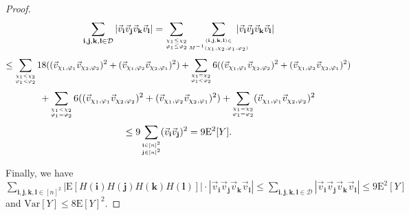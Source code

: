 \def\draft{0}  \documentclass[proceedings]{stacs}
\theoremstyle{plain}\newtheorem{satz}[thm]{Satz}
\theoremstyle{definition}\newtheorem{crucial}[thm]{Crucial Definition}
\begin{document}
\begin{proof}
$$
\sum_{\mathbf i, \mathbf j, \mathbf k, \mathbf l \in \mathcal D} |\vec v_{\mathbf i}\vec v_{\mathbf j}\vec v_{\mathbf k}\vec v_{\mathbf l}|
 =  \sum_{\scriptsize{}\substack{\chi_1 \leq \chi_2 \\ \varphi_1 \leq \varphi_2}}\sum_{\scriptsize{}\substack{(\mathbf i, \mathbf j, \mathbf k, \mathbf l) \in \\  M^{-1}(\chi_1,\chi_2,\varphi_1, \varphi_2)}}\hspace{-.5cm} |\vec v_{\mathbf i}\vec v_{\mathbf j}\vec v_{\mathbf k}\vec v_{\mathbf l}| \\
$$
$$
\leq \sum_{\scriptsize{}\substack{\chi_1 < \chi_2 \\ \varphi_1 < \varphi_2}} 18((\vec v_{\chi_1, \varphi_1}\vec v_{\chi_2, \varphi_2})^2 + (
\vec v_{\chi_1, \varphi_2}\vec v_{\chi_2, \varphi_1})^2) + \sum_{\scriptsize{}\substack{\chi_1 = \chi_2 \\ \varphi_1 < \varphi_2}} 6((\vec v_{\chi_1, \varphi_1}\vec v_{\chi_2, \varphi_2})^2 + (
\vec v_{\chi_1, \varphi_2}\vec v_{\chi_2, \varphi_1})^2) 
$$
$$
+ \sum_{\scriptsize{}\substack{\chi_1 < \chi_2 \\ \varphi_1 = \varphi_2}} 6((\vec v_{\chi_1, \varphi_1}\vec v_{\chi_2, \varphi_2})^2 + (
\vec v_{\chi_1, \varphi_2} \vec v_{\chi_2, \varphi_1})^2) + \sum_{\scriptsize{}\substack{\chi_1 = \chi_2 \\ \varphi_1 = \varphi_2}} (\vec v_{\chi_1, \varphi_1}\vec v_{\chi_2, \varphi_2})^2 \\
$$
$$
\leq 9 \sum_{\scriptsize{}\substack{\mathbf i \in [n]^2 \\ \mathbf j \in [n]^2}}(\vec v_{\mathbf i}\vec v_{\mathbf j})^2 = 9 \mathrm E^2[Y].
$$

Finally, we have $\sum_{\mathbf i, \mathbf j, \mathbf k, \mathbf l \in [n]^2} \left|\mathrm E[H(\mathbf i)H(\mathbf j)H(\mathbf k)H(\mathbf l)]\right| \cdot |\vec v_{\mathbf i}\vec v_{\mathbf j}\vec v_{\mathbf k}\vec v_{\mathbf l}|
\leq \sum_{\mathbf i, \mathbf j, \mathbf k, \mathbf l \in \mathcal D} |\vec v_{\mathbf i}\vec v_{\mathbf j}\vec v_{\mathbf k}\vec v_{\mathbf l}| \leq 9 \mathrm E^2[Y]$ and
$\mathrm{Var}[Y] \leq 8\mathrm E[Y]^2$.
\end{proof}
\end{document}
